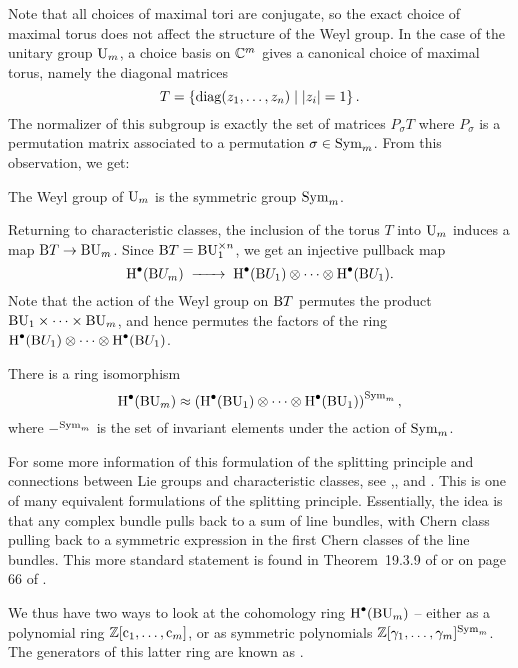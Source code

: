 Note that all choices of maximal tori are conjugate, so the exact choice of maximal torus does not affect the structure of the Weyl group.
In the case of the unitary group $\mathrm{U}_m$, a choice basis on $\mathbb{C}^m$ gives a canonical choice of maximal torus, namely the diagonal matrices
\[
	T = \left\{\mathrm{diag}(z_1,\ldots, z_n) \mid |z_i|=1\right\}.
\]
The normalizer of this subgroup is exactly the set of matrices $P_\sigma T$ where $P_\sigma$ is a permutation matrix associated to a permutation $\sigma\in \mathrm{Sym}_m$. From this observation, we get:
\begin{proposition}
	The Weyl group of $\mathrm{U}_m$ is the symmetric group $\mathrm{Sym}_m$.
\end{proposition}

Returning to characteristic classes, the inclusion of the torus $T$ into $\mathrm{U}_m$ induces a map $\mathrm{B} T \to \mathrm{BU}_m$. 
Since $\mathrm{B} T = \mathrm{BU}_1^{\times n}$, we get an injective pullback map
\[
		\H^\bullet(\BB U_m) \lkxto \H^\bullet(\BB U_1)\otimes \cdots \otimes \H^\bullet(\BB U_1).
\]
Note that the action of the Weyl group on $\mathrm{B} T$ permutes the product $\mathrm{BU}_1\times \cdots\times \mathrm{BU}_m$, and hence permutes the factors of the ring $\operatorname{H}^\bullet(\mathrm{B} U_1)\otimes \cdots\otimes \operatorname{H}^\bullet(\mathrm{B} U_1)$.

\begin{theorem}
	There is a ring isomorphism \[\operatorname{H}^\bullet(\mathrm{BU}_m)\approx \left(\operatorname{H}^\bullet(\mathrm{BU}_1)\otimes \cdots\otimes \operatorname{H}^\bullet(\mathrm{BU}_1)\right)^{\mathrm{Sym}_m},\]
	where $-^{\mathrm{Sym}_m}$ is the set of invariant elements under the action of $\mathrm{Sym}_m$.
\end{theorem}

For some more information of this formulation of the splitting principle and connections between Lie groups and characteristic classes, see \cite{adams1978maps},\cite{adams1978maps2}, and \cite{toda1987}. This is one of many equivalent formulations of the splitting principle. Essentially, the idea is that any complex bundle pulls back to a sum of line bundles, with Chern class pulling back to a symmetric expression in the first Chern classes of the line bundles.
This more standard statement is found in Theorem~19.3.9 of \cite{dieck2008algebraic} or on page 66 of \cite{hatcher2003ktheory}.

We thus have two ways to look at the cohomology ring $\operatorname{H}^\bullet(\mathrm{BU}_m)$ -- either as a polynomial ring $\mathbb{Z}[\mathrm{c}_1,\ldots, \mathrm{c}_m]$, or as symmetric polynomials $\mathbb{Z}[\gamma_1,\ldots, \gamma_m]^{\mathrm{Sym}_m}$. The generators of this latter ring are known as .

